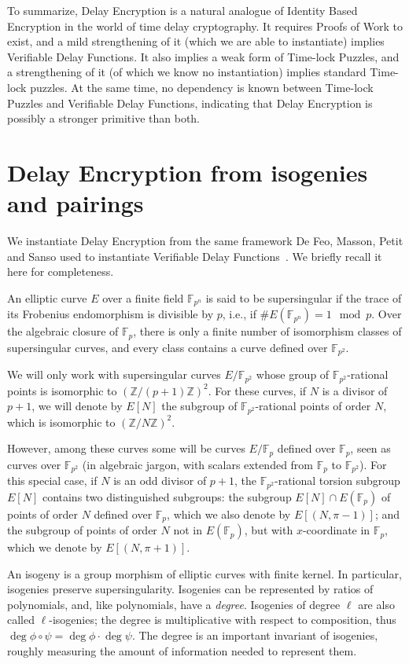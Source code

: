 \documentclass{llncs}
\newcommand{\Z}{\mathbb{Z}}
\newcommand{\F}{\mathbb{F}}
\begin{document}
\medskip

To summarize, Delay Encryption is a natural analogue of Identity Based
Encryption in the world of time delay cryptography. %
It requires Proofs of Work to exist, and a mild strengthening of it
(which we are able to instantiate) implies Verifiable Delay
Functions. %
It also implies a weak form of Time-lock Puzzles, and a strengthening
of it (of which we know no instantiation) implies standard Time-lock
puzzles. %
At the same time, no dependency is known between Time-lock Puzzles and
Verifiable Delay Functions, indicating that Delay Encryption is
possibly a stronger primitive than both.


\section{Delay Encryption from isogenies and pairings}
\label{sec:delay-encrypt-from}

We instantiate Delay Encryption from the same framework De Feo,
Masson, Petit and Sanso used to instantiate Verifiable Delay
Functions~\cite{10.1007/978-3-030-34578-5_10}. %
We briefly recall it here for completeness.

An elliptic curve $E$ over a finite field $\F_{p^n}$ is said to be
supersingular if the trace of its Frobenius endomorphism is divisible
by $p$, i.e., if $\#E(\F_{p^n})=1\mod p$. %
Over the algebraic closure of $\F_p$, there is only a finite number of
isomorphism classes of supersingular curves, and every class contains
a curve defined over $\F_{p^2}$. %

We will only work with supersingular curves $E/\F_{p^2}$ whose group
of $\F_{p^2}$-rational points is isomorphic to ${(\Z/(p+1)\Z)}^2$. %
For these curves, if $N$ is a divisor of $p+1$, we will denote by
$E[N]$ the subgroup of $\F_{p^2}$-rational points of order $N$, which
is isomorphic to ${(\Z/N\Z)}^2$.

However, among these curves some will be curves $E/\F_p$ defined over
$\F_p$, seen as curves over $\F_{p^2}$ (in algebraic jargon, with
scalars extended from $\F_p$ to $\F_{p^2}$). %
For this special case, if $N$ is an odd divisor of $p+1$, the
$\F_{p^2}$-rational torsion subgroup $E[N]$ contains two distinguished
subgroups: the subgroup $E[N]\cap E(\F_p)$ of points of order $N$
defined over $\F_p$, which we also denote by $E[(N,\pi-1)]$; and the
subgroup of points of order $N$ not in $E(\F_p)$, but with
$x$-coordinate in $\F_p$, which we denote by $E[(N,\pi+1)]$.

An isogeny is a group morphism of elliptic curves with finite
kernel. %
In particular, isogenies preserve supersingularity. %
Isogenies can be represented by ratios of polynomials, and, like
polynomials, have a \emph{degree}. %
Isogenies of degree $\ell$ are also called $\ell$-isogenies; the
degree is multiplicative with respect to composition, thus
$\deg\phi\circ\psi=\deg\phi\cdot\deg\psi$. %
The degree is an important invariant of isogenies, roughly measuring
the amount of information needed to represent them.
\end{document}
